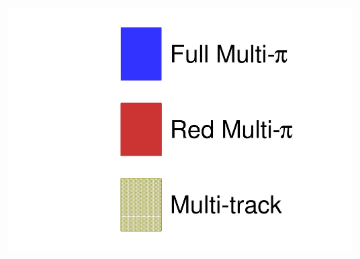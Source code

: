 \begin{figure}[h]
\begin{subfigure}[t]{0.32\textwidth}
	\end{subfigure}
	\begin{subfigure}[t]{0.32\textwidth}
		\includegraphics[width=\textwidth, trim={0mm 0mm 0mm 0mm}, clip, page=6]{figures/mach3/2018/data/2018_results_test_spectra_2018_results_test_redcov_spectra_2018_results_test_multitrack_spectra}
	\end{subfigure}
	

\end{figure}
